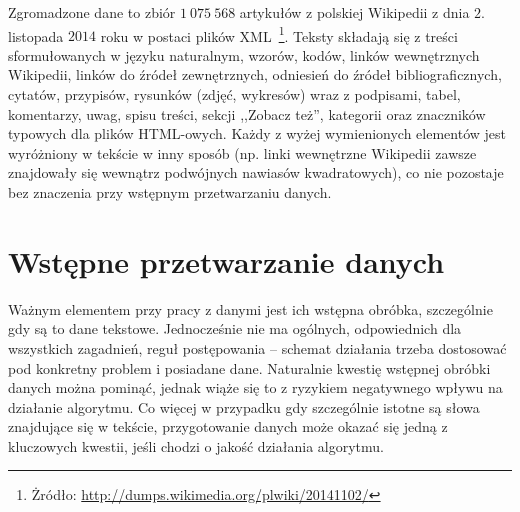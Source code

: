 \documentclass{praca1}
\begin{document}
Zgromadzone dane to zbiór $1\ 075\ 568$ artykułów z polskiej Wikipedii z dnia $2.$ listopada $2014$ roku w postaci plików XML~\footnote{Żródło: \url{http://dumps.wikimedia.org/plwiki/20141102/}}. Teksty składają się z treści sformułowanych w języku naturalnym, wzorów, kodów, linków wewnętrznych Wikipedii, linków do źródeł zewnętrznych, odniesień do źródeł bibliograficznych, cytatów, przypisów, rysunków (zdjęć, wykresów) wraz z podpisami, tabel, komentarzy, uwag, spisu treści, sekcji ,,Zobacz też'', kategorii oraz znaczników typowych dla plików HTML-owych. Każdy z wyżej wymienionych elementów jest wyróżniony w tekście w inny sposób (np. linki wewnętrzne Wikipedii zawsze znajdowały się wewnątrz podwójnych nawiasów kwadratowych), co nie pozostaje bez znaczenia przy wstępnym przetwarzaniu danych.

\section{Wstępne przetwarzanie danych}

Ważnym elementem przy pracy z danymi jest ich wstępna obróbka, szczególnie gdy są to dane tekstowe. Jednocześnie nie ma ogólnych, odpowiednich dla wszystkich zagadnień, reguł postępowania -- schemat działania trzeba dostosować pod konkretny problem i posiadane dane. Naturalnie kwestię wstępnej obróbki danych można pominąć, jednak wiąże się to z ryzykiem negatywnego wpływu na działanie algorytmu. Co więcej w przypadku gdy szczególnie istotne są słowa znajdujące się w tekście, przygotowanie danych może okazać się jedną z kluczowych kwestii, jeśli chodzi o jakość działania algorytmu.
\end{document}
